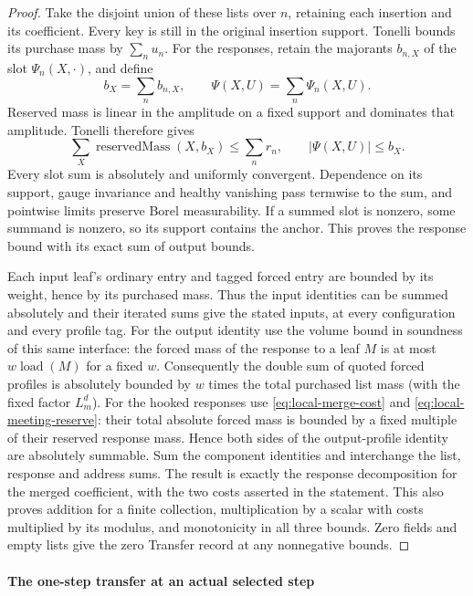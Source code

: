 \begin{proof}
Take the disjoint union of these lists over $n$, retaining each
insertion and its coefficient. Every key is still in the original
insertion support. Tonelli bounds its purchase mass by $\sum_n u_n$.
For the responses, retain the majorants $b_{n,X}$ of the slot
$\Psi_n(X,\cdot)$, and define
\[
 b_X=\sum_n b_{n,X},\qquad
 \Psi(X,U)=\sum_n\Psi_n(X,U).
\]
Reserved mass is linear in the amplitude on a fixed support and
dominates that amplitude. Tonelli therefore gives
\[
 \sum_X\operatorname{reservedMass}(X,b_X)
 \le\sum_n r_n,
 \qquad |\Psi(X,U)|\le b_X.
\]
Every slot sum is absolutely and uniformly convergent. Dependence on
its support, gauge invariance and healthy vanishing pass termwise
to the sum, and pointwise limits preserve Borel measurability. If a
summed slot is nonzero, some summand is nonzero, so its support
contains the anchor. This proves the response bound with its exact
sum of output bounds.

Each input leaf's ordinary entry and tagged forced entry are bounded
by its weight, hence by its purchased mass. Thus the input identities
can be summed absolutely and their iterated sums give the stated
inputs, at every configuration and every profile tag.
For the output identity use the volume bound in soundness of this
same interface: the forced mass of the response to a leaf $M$ is at most
$w\operatorname{load}(M)$ for a fixed $w$. Consequently the double
sum of quoted forced profiles is absolutely bounded by $w$ times
the total purchased list mass (with the fixed factor $L_m^d$).
For the hooked responses use \eqref{eq:local-merge-cost} and
\eqref{eq:local-meeting-reserve}: their total absolute forced mass
is bounded by a fixed multiple of their reserved response mass.
Hence both sides of the output-profile identity are absolutely
summable. Sum the component identities and interchange the list,
response and address sums. The result is exactly the response decomposition for the
merged coefficient, with the two costs asserted in the statement.
This also proves addition for a finite collection, multiplication
by a scalar with costs multiplied by its modulus, and monotonicity
in all three bounds. Zero fields and empty lists give the zero
Transfer record at any nonnegative bounds.
\end{proof}

\paragraph{The one-step transfer at an actual selected step}
\label{sec:selected-reprise}

